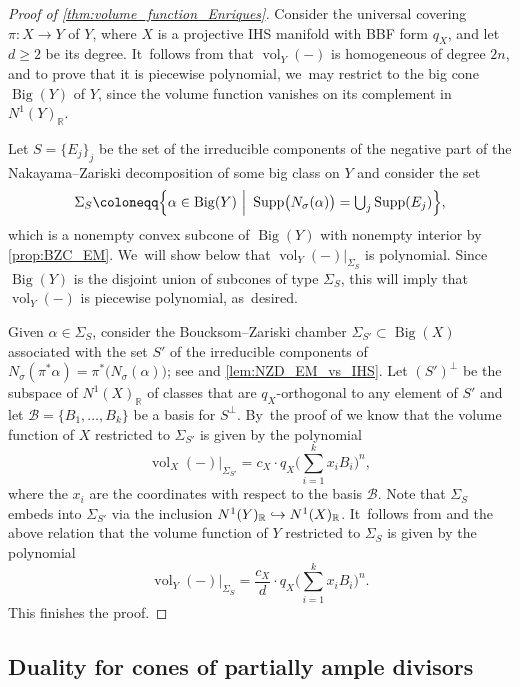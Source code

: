 \documentclass[JEP,XML,SOM,Unicode,published]{cedram}
\newcommand\hto{\mathrel{\lhook\joinrel\to}}
\let\ts\textstyle
\theoremstyle{plain}
\theoremstyle{definition}
\newcommand{\R}{\mathbb{R}}
\DeclareMathOperator{\Supp}{Supp}
\DeclareMathOperator{\vol}{vol}
\DeclareMathOperator{\BgCn}{\mathrm{Big}}
\begin{document}
\begin{proof}[Proof of \autoref{thm:volume_function_Enriques}]
Consider the universal covering $\pi \colon X \to Y$ of $Y$, where $X$ is a projective IHS manifold with BBF form $q_X$, and let $d \geq 2$ be its degree. It~follows from \cite[Prop.\,2.2.35]{Laz04book_I} that $\vol_Y(-)$ is homogeneous of degree $2n$, and to prove that it is piecewise polynomial, we~may restrict to the big cone $\BgCn(Y)$ of $Y$, since the volume function vanishes on its complement in $N^1(Y)_\R$.

Let $S = \{ E_j \}_j$ be the set of the irreducible components of the negative part of the Nakayama--Zariski decomposition of some big class on $Y$ and consider the set
\[\ts
\Sigma_S \coloneqq \Bigl\{ \alpha \in \BgCn(Y) \ \Big| \ \Supp \bigl(N_{\sigma}(\alpha) \bigr) = \bigcup_j \Supp(E_j) \Bigr\},
\]
which is a nonempty convex subcone of $\BgCn(Y)$ with nonempty interior by \autoref{prop:BZC_EM}. We~will show below that $\vol_Y(-) |_{\Sigma_S}$ is polynomial. Since $\BgCn(Y)$ is the disjoint union of subcones of type $\Sigma_S$, this will imply that $\vol_Y(-)$ is piecewise polynomial, as~desired.

Given $\alpha \in \Sigma_S$, consider the Boucksom--Zariski chamber $\Sigma_{S'} \subset \BgCn(X)$ associated with the set $S'$ of the irreducible components of $N_\sigma(\pi^*\alpha) = \pi^* \bigl(N_{\sigma}(\alpha) \bigr)$; see \cite[Def.\,4.11]{Denisi23} and \autoref{lem:NZD_EM_vs_IHS}. Let $(S')^{\perp}$ be the subspace of $N^1(X)_\R$ of classes that are $q_X$-orthogonal to any element of $S'$ and let $\mathcal{B} = \{B_1,\dots,B_k\}$ be a basis for $S^{\perp}$. By~the proof of \cite[Th.\,1.6(2)]{Denisi23} we know that the volume function of $X$ restricted to $\Sigma_{S'}$ is given by the polynomial
\[
\vol_{X}(-) \big\vert_{\Sigma_{S'}} = c_X \cdot q_X \biggl(\sum_{i=1}^k x_i B_i \biggr)^n,
\]
where the $x_i$ are the coordinates with respect to the basis $\mathcal{B}$.
Note that $\Sigma_S$ embeds into $\Sigma_{S'}$ via the inclusion $N^1(Y)_\R \hto N^1(X)_\R$. It~follows from \cite[Prop.\,2.9(1)]{Kuronya06} and the above relation that the volume function of $Y$ restricted to $\Sigma_S$ is given by the polynomial
\[
\vol_{Y}(-) \big\vert_{\Sigma_S} = \frac{c_X}{d} \cdot q_X \biggl(\sum_{i=1}^k x_i B_i \biggr)^n.
\]
This finishes the proof.
\end{proof}

\subsection{Duality for cones of partially ample divisors}
\label{subsection:duality}
\end{document}
